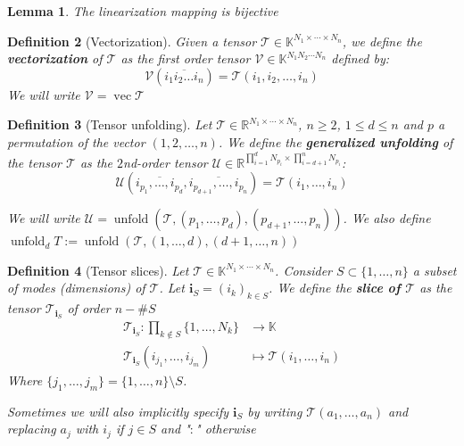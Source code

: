 \documentclass[11pt,a4paper,openright,oneside]{book}
\numberwithin{equation}{section}
\newtheorem{defn0}{Definition}[chapter]
\newtheorem{lemma0}[defn0]{Lemma}
\newenvironment{definition}{ \begin{defn0}}{\end{defn0}}
\newenvironment{lemma}{\bigskip \begin{lemma0}}{\end{lemma0}}
\DeclareMathOperator{\vectorize}{vec}
\DeclareMathOperator{\unfolding}{unfold}
\begin{document}
\begin{lemma}
    The linearization mapping is bijective
\end{lemma}

\begin{definition}[Vectorization]
    Given a tensor $\mathcal{T} \in \mathbb{K}^{N_1 \times \cdots \times N_n}$, we define the \textbf{vectorization} of $\mathcal{T}$
    as the first order tensor $\mathcal{V} \in \mathbb{K}^{N_1 N_2 \cdots N_n}$ defined by:
    $$\mathcal{V}(\overline{i_1 i_2 \dots i_n}) = \mathcal{T}(i_1, i_2, \dots, i_n)$$
    We will write $\mathcal{V} = \vectorize{\mathcal{T}}$
\end{definition}


\begin{definition}[Tensor unfolding]
Let $\mathcal{T} \in \mathbb{R}^{N_1 \times \cdots \times N_n}$, $n \geqslant 2$, $1 \leqslant d \leqslant n$ and $p$ a permutation of the vector $(1,2,\dots, n)$. We define the
\textbf{generalized unfolding} of the tensor $\mathcal{T}$ as the $2$nd-order tensor 
$\mathcal{U} \in \mathbb{R}^{\prod_{i=1}^d N_{p_i} \times \prod_{i=d+1}^n N_{p_i}}$:
$$ \mathcal{U} (\overline{i_{p_1}, \dots, i_{p_d}}, \overline{i_{p_{d+1}}, \dots, i_{p_n}}) = \mathcal{T}(i_1, \dots, i_n)$$

We will write $\mathcal{U} = \unfolding{(\mathcal{T}, (p_1, \dots, p_d), (p_{d+1}, \dots, p_n))}$. 
We also define $\unfolding_d T := \unfolding{(\mathcal{T}, (1, \dots, d), (d+1, \dots, n))}$
\end{definition}



\begin{definition}[Tensor slices]

    Let $\mathcal{T} \in \mathbb{K}^{N_1\times \cdots \times N_n}$. Consider $S \subset \{1, \dots, n\}$ a subset of modes (dimensions)
    of $\mathcal{T}$. Let $\mathbf{i}_S = (i_k)_{k \in S}$. We define the \textbf{slice of $\mathcal{T}$} as the tensor $\mathcal{T}_{\mathbf{i}_S}$
    of order $n - \#S$
    $$\begin{align}
        \mathcal{T}_{\mathbf{i}_S} : \prod_{k \not\in S} \{1, \dots, N_k\} & \longrightarrow \mathbb{K} \\
        \mathcal{T}_{\mathbf{i}_S}(i_{j_1}, \dots, i_{j_m}) & \longmapsto \mathcal{T}(i_1, \dots, i_n)
    \end{align}$$
    Where $\{j_1, \dots, j_m\} = \{1, \dots, n\} \setminus S$. 

    Sometimes we will also implicitly specify $\mathbf{i}_S$ by writing $\mathcal{T}(a_1, \dots, a_n)$ and replacing $a_j$ with $i_j$ if $j \in S$ and "$:$" otherwise

\end{definition}
\end{document}
